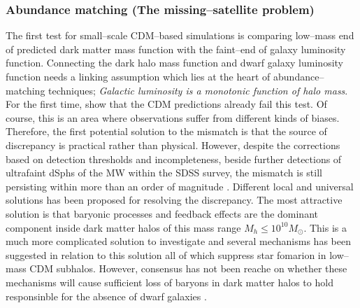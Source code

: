 \documentclass[paper=a4, fontsize=11pt]{scrartcl} %
\numberwithin{equation}{section} %
\numberwithin{figure}{section} %
\numberwithin{table}{section} %
\begin{document}
\subsubsection{Abundance matching (The missing--satellite problem)}
\label{subsec:missing-satellite}
The first test for small--scale CDM--based simulations is comparing low--mass end of predicted dark matter mass function with the faint--end of galaxy luminosity function. Connecting the dark halo mass function and dwarf galaxy luminosity function needs a linking assumption which lies at the heart of abundance--matching techniques; \emph{Galactic luminosity is a monotonic function of halo mass}. For the first time, \citet[][]{Klypin+1999, Moore+1999} show that the CDM predictions already fail this test. Of course, this is an area where observations suffer from different kinds of biases. Therefore, the first potential solution to the mismatch is that the source of discrepancy is practical rather than physical. However, despite the corrections based on detection thresholds and incompleteness, beside further detections of ultrafaint dSphs of the MW within the SDSS survey, the mismatch is still persisting within more than an order of magnitude \citep[See e.g.][]{Pawlowski+2015}. Different local and universal solutions has been proposed for resolving the discrepancy. The most attractive solution is that baryonic processes and feedback effects are the dominant component inside dark matter halos of this mass range $M_h \leq 10^{10} M_\odot$. This is a much more complicated solution to investigate and several mechanisms has been suggested in relation to this solution all of which suppress star fomarion in low--mass CDM subhalos. However, consensus has not been reache on whether these mechanisms will cause sufficient loss of baryons in dark matter halos to hold responsinble for the absence of dwarf galaxies \citep[See e.g. \citet{Brooks+2013, Sawala+2014, DelPopolo+2014} claiming to have found baryonic solutions to the problem, but also for opposite arguments see \citet{Bullock+2010, Klypin+2015}][]{}.

 
\end{document}
